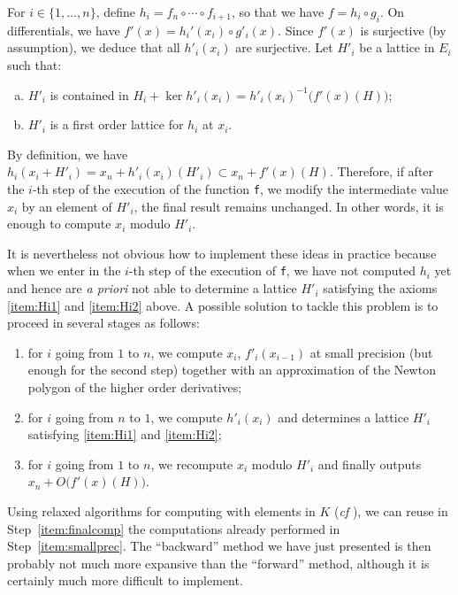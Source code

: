 \documentclass{lms}
\begin{document}
For $i \in \{1, \ldots, n\}$, define $h_i = f_n \circ \cdots \circ 
f_{i+1}$, so that we have $f = h_i \circ g_i$. On differentials, we 
have $f'(x) = h_i'(x_i) \circ g'_i(x)$. Since $f'(x)$ is surjective (by 
assumption), we deduce that all $h'_i(x_i)$ are surjective. Let $H'_i$ 
be a lattice in $E_i$ such that:
\begin{enumerate}[(a)] 
\item \label{item:Hi1}
$H'_i$ is contained in $H_i + \ker h'_i(x_i) = h'_i(x_i)^{-1}
\big(f'(x)(H)\big)$;
\item \label{item:Hi2}
$H'_i$ is a first order lattice for $h_i$ at $x_i$.
\end{enumerate}
By definition, we have
$h_i(x_i + H'_i) = x_n + h'_i(x_i)(H'_i) \subset x_n + f'(x)(H)$.
Therefore, if after the $i$-th step of the execution of the function
{\tt f}, we modify the intermediate value $x_i$ by an element of
$H'_i$, the final result remains unchanged. In other words, it is
enough to compute $x_i$ modulo $H'_i$.

It is nevertheless not obvious how to implement these ideas in practice
because when we enter in the $i$-th step of the execution of {\tt f},
we have not computed $h_i$ yet and hence are \emph{a priori} not able
to determine a lattice $H'_i$ satisfying the axioms \eqref{item:Hi1}
and \eqref{item:Hi2} above.
A possible solution to tackle this problem is to proceed in several
stages as follows: 
\begin{enumerate}[(1)]
\item \label{item:smallprec}
for $i$ going from $1$ to $n$, we compute $x_i$, $f'_i(x_{i-1})$ 
at small precision (but enough for the second step) together with an
approximation of the Newton polygon of the higher order derivatives;
\item \label{item:determineHi}
for $i$ going from $n$ to $1$, we compute $h'_i(x_i)$ and
determines a lattice $H'_i$ satisfying \eqref{item:Hi1} and 
\eqref{item:Hi2};
\item \label{item:finalcomp}
for $i$ going from $1$ to $n$, we recompute $x_i$ modulo $H'_i$
and finally outputs $x_n + O\big(f'(x)(H)\big)$.
\end{enumerate}
Using relaxed algorithms for computing with elements in $K$ (\emph{cf} 
\cite{hoeven1, hoeven2, berthomieu}), we can reuse in 
Step~\eqref{item:finalcomp} the computations already performed in 
Step~\eqref{item:smallprec}. The ``backward'' method we have just 
presented is then probably not much more expansive than the ``forward'' 
method, although it is certainly much more difficult to implement.
\end{document}
